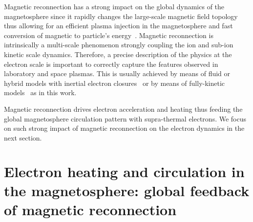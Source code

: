 \documentclass{aa}
\begin{document}
Magnetic reconnection has a strong impact on the global dynamics of the magnetosphere since it rapidly changes the large-scale magnetic field topology thus allowing for an efficient plasma injection in the magnetosphere and fast conversion of magnetic to particle's energy~\citep{Vasyliunas1975,Yamada2010,Treumann2013}. Magnetic reconnection is intrinsically a multi-scale phenomenon strongly coupling the ion and sub-ion kinetic scale dynamics. Therefore, a precise description of the physics at the electron scale is important to correctly capture the features observed in laboratory and space plasmas. This is usually achieved by means of fluid or hybrid models with inertial electron closures~\citep{Wang2015,Ng2017,Finelli2021,Fadanelli2021,Jain2022} or by means of fully-kinetic models~\citep{Pritchett2001,Pritchett2001_GEM,Divin2007,Haggerty2015} as in this work.

Magnetic reconnection drives electron acceleration and heating thus feeding the global magnetosphere circulation pattern with supra-thermal electrons. We focus on such strong impact of magnetic reconnection on the electron dynamics in the next section.


\section{Electron heating and circulation in the magnetosphere: global feedback of magnetic reconnection}\label{sec:Result_electrons}
\end{document}
